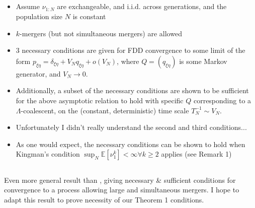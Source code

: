 \documentclass{article}
\newcommand{\E}{\mathbb{E}}
\begin{document}
\subsection*{\cite{sagitov1999}}
\begin{itemize}
\item Assume $\nu_{1:N}$ are exchangeable, and i.i.d. across generations, and the population size $N$ is constant
\item $k$-mergers (but not simultaneous mergers) are allowed
\item 3 necessary conditions are given for FDD convergence to some limit of the form $p_{\xi\eta} = \delta_{\xi\eta} + V_N q_{\xi\eta} + o(V_N)$, where $Q=(q_{\xi\eta})$ is some Markov generator, and $V_N \to 0$.
\item Additionally, a subset of the necessary conditions are shown to be sufficient for the above asymptotic relation to hold with specific $Q$ corresponding to a $\Lambda$-coalescent, on the (constant, deterministic) time scale $T_N^{-1} \sim V_N$.
\item Unfortunately I didn't really understand the second and third conditions...
\item As one would expect, the necessary conditions can be shown to hold when Kingman's condition $\sup_N \E[\nu_1^k]<\infty \forall k\geq 2$ applies (see Remark 1)
\end{itemize}


\subsection*{\cite{mohle1999}}

\subsection*{\cite{mohle2000}}

\subsection*{\cite{mohle2001}}
Even more general result than \cite{mohle1998}, giving necessary \& sufficient conditions for convergence to a process allowing large and simultaneous mergers. I hope to adapt this result to prove necessity of our Theorem 1 conditions.

\subsection*{\cite{mohle2003}}
\end{document}
